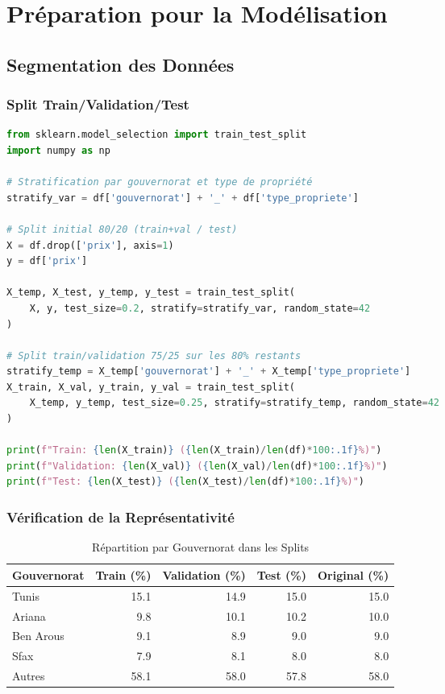 \section{Préparation pour la Modélisation}
\label{sec:preparation_modelisation}

\subsection{Segmentation des Données}
\label{subsec:segmentation_donnees}

\subsubsection{Split Train/Validation/Test}

\begin{lstlisting}[language=Python,caption=Segmentation des Données]
from sklearn.model_selection import train_test_split
import numpy as np

# Stratification par gouvernorat et type de propriété
stratify_var = df['gouvernorat'] + '_' + df['type_propriete']

# Split initial 80/20 (train+val / test)
X = df.drop(['prix'], axis=1)
y = df['prix']

X_temp, X_test, y_temp, y_test = train_test_split(
    X, y, test_size=0.2, stratify=stratify_var, random_state=42
)

# Split train/validation 75/25 sur les 80% restants
stratify_temp = X_temp['gouvernorat'] + '_' + X_temp['type_propriete']
X_train, X_val, y_train, y_val = train_test_split(
    X_temp, y_temp, test_size=0.25, stratify=stratify_temp, random_state=42
)

print(f"Train: {len(X_train)} ({len(X_train)/len(df)*100:.1f}%)")
print(f"Validation: {len(X_val)} ({len(X_val)/len(df)*100:.1f}%)")
print(f"Test: {len(X_test)} ({len(X_test)/len(df)*100:.1f}%)")
\end{lstlisting}

\subsubsection{Vérification de la Représentativité}

\begin{table}[H]
\centering
\caption{Répartition par Gouvernorat dans les Splits}
\begin{tabular}{|l|r|r|r|r|}
\hline
\textbf{Gouvernorat} & \textbf{Train (\%)} & \textbf{Validation (\%)} & \textbf{Test (\%)} & \textbf{Original (\%)} \\
\hline
Tunis & 15.1 & 14.9 & 15.0 & 15.0 \\
\hline
Ariana & 9.8 & 10.1 & 10.2 & 10.0 \\
\hline
Ben Arous & 9.1 & 8.9 & 9.0 & 9.0 \\
\hline
Sfax & 7.9 & 8.1 & 8.0 & 8.0 \\
\hline
Autres & 58.1 & 58.0 & 57.8 & 58.0 \\
\hline
\end{tabular}
\label{tab:repartition_splits}
\end{table}

